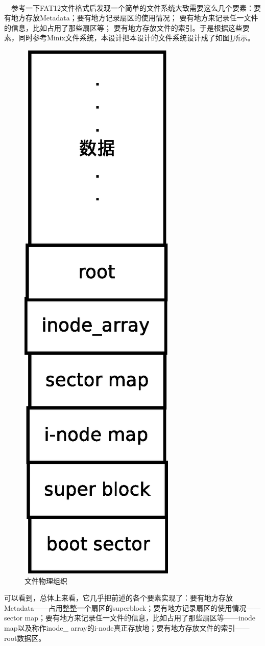 \documentclass[UTF8,nofonts,cs4size]{ctexrep}
\begin{document}
\paragraph{}
\indent \ \ 参考一下FAT12文件格式后发现一个简单的文件系统大致需要这么几个要素：要有地方存放Metadata；要有地方记录扇区的使用情况；
要有地方来记录任一文件的信息，比如占用了那些扇区等；
要有地方存放文件的索引。于是根据这些要素，同时参考Minix文件系统，本设计把本设计的文件系统设计成了如图\ref{file}所示。
\begin{figure}[htp]
\centering
\includegraphics[scale=0.4]{file.eps}
\caption{文件物理组织}
\label{file}
\end{figure}
可以看到，总体上来看，它几乎把前述的各个要素实现了：要有地方存放Metadata——占用整整一个扇区的superblock；要有地方记录扇区的使用情况——sector map；要有地方来记录任一文件的信息，比如占用了那些扇区等——inode map以及称作inode\_ array的i-node真正存放地；要有地方存放文件的索引——root数据区。
\end{document}
